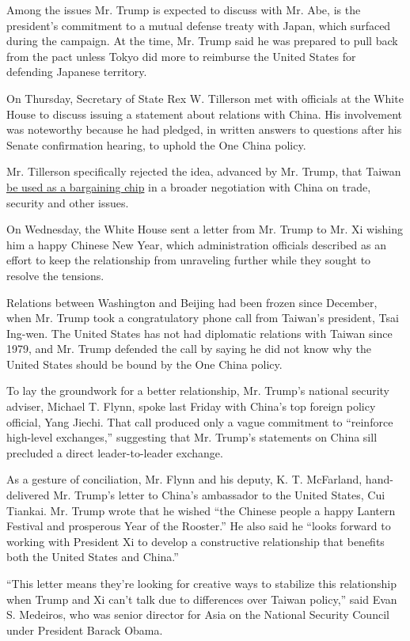 Among the issues Mr. Trump is expected to discuss with Mr. Abe, is the
president's commitment to a mutual defense treaty with Japan, which
surfaced during the campaign. At the time, Mr. Trump said he was
prepared to pull back from the pact unless Tokyo did more to reimburse
the United States for defending Japanese territory.

On Thursday, Secretary of State Rex W. Tillerson met with officials at
the White House to discuss issuing a statement about relations with
China. His involvement was noteworthy because he had pledged, in written
answers to questions after his Senate confirmation hearing, to uphold
the One China policy.

Mr. Tillerson specifically rejected the idea, advanced by Mr. Trump,
that Taiwan
\href{https://www.nytimes.com/2016/12/11/us/politics/trump-taiwan-one-china.html}{be
used as a bargaining chip} in a broader negotiation with China on trade,
security and other issues.

On Wednesday, the White House sent a letter from Mr. Trump to Mr. Xi
wishing him a happy Chinese New Year, which administration officials
described as an effort to keep the relationship from unraveling further
while they sought to resolve the tensions.

Relations between Washington and Beijing had been frozen since December,
when Mr. Trump took a congratulatory phone call from Taiwan's president,
Tsai Ing-wen. The United States has not had diplomatic relations with
Taiwan since 1979, and Mr. Trump defended the call by saying he did not
know why the United States should be bound by the One China policy.

To lay the groundwork for a better relationship, Mr. Trump's national
security adviser, Michael T. Flynn, spoke last Friday with China's top
foreign policy official, Yang Jiechi. That call produced only a vague
commitment to ``reinforce high-level exchanges,'' suggesting that Mr.
Trump's statements on China sill precluded a direct leader-to-leader
exchange.

As a gesture of conciliation, Mr. Flynn and his deputy, K. T. McFarland,
hand-delivered Mr. Trump's letter to China's ambassador to the United
States, Cui Tiankai. Mr. Trump wrote that he wished ``the Chinese people
a happy Lantern Festival and prosperous Year of the Rooster.'' He also
said he ``looks forward to working with President Xi to develop a
constructive relationship that benefits both the United States and
China.''

``This letter means they're looking for creative ways to stabilize this
relationship when Trump and Xi can't talk due to differences over Taiwan
policy,'' said Evan S. Medeiros, who was senior director for Asia on the
National Security Council under President Barack Obama.


